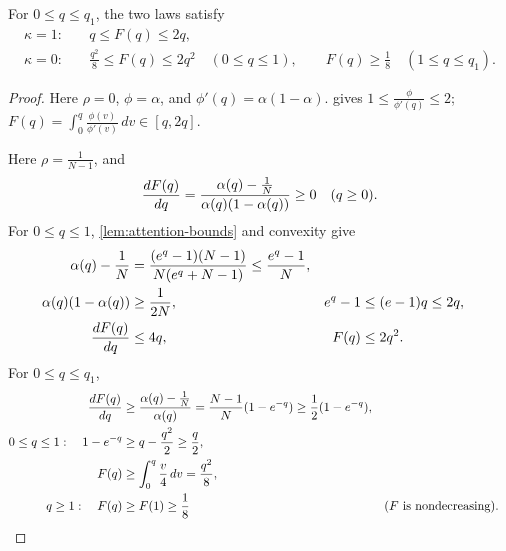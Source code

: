 \begin{lemma}
\label{lem:primitive-bounds}
For $0\le q\le q_1$, the two laws satisfy
\begin{align}
 \kappa=1:\quad &q\le F(q)\le2q,\label{eq:ordinary-primitive-bounds}\\
 \kappa=0:\quad &\frac{q^2}{8}\le F(q)\le2q^2\quad(0\le q\le1),\qquad
 F(q)\ge\frac{1}{8}\quad(1\le q\le q_1).
 \label{eq:cancelled-primitive-bounds}
\end{align}
\end{lemma}
\begin{proof}

Here $\rho=0$, $\phi=\alpha$, and $\phi'(q)=\alpha(1-\alpha)$.
 gives $1\le \tfrac{\phi}{\phi'(q)}\le2$;
$F(q)=\int_0^q\tfrac{\phi(v)}{\phi'(v)}\,dv\in[q,2q]$.


Here $\rho=\tfrac{1}{N-1}$, and
\[
 \frac{d F(q)}{d q}=\frac{\alpha(q)-\frac{1}{N}}{\alpha(q)(1-\alpha(q))}\ge0\quad(q\ge0).
\]
For $0\le q\le1$, \cref{lem:attention-bounds} and convexity give
\begin{align*}
 \alpha(q)-\frac{1}{N}
 &=\frac{(e^q-1)(N-1)}{N(e^q+N-1)}\le\frac{e^q-1}{N},\\
 \alpha(q)(1-\alpha(q))&\ge\frac{1}{2N},&
 e^q-1&\le(e-1)q\le2q,\\
 \frac{d F(q)}{d q}&\le4q,&F(q)&\le2q^2.
\end{align*}
For $0\le q\le q_1$,
\begin{align*}
 \frac{d F(q)}{d q}&\ge\frac{\alpha(q)-\frac{1}{N}}{\alpha(q)}
 =\frac{N-1}{N}(1-e^{-q})\ge\frac{1}{2}(1-e^{-q}),\\
 0\le q\le1:\quad
 1-e^{-q}&\ge q-\frac{q^2}{2}\ge \frac{q}{2},\\
 F(q)&\ge\int_0^q \frac{v}{4}\,dv=\frac{q^2}{8},\\
 q\ge1:\quad F(q)&\ge F(1)\ge\frac{1}{8}&&\text{($F$ is nondecreasing)}.
\end{align*}
\end{proof}

